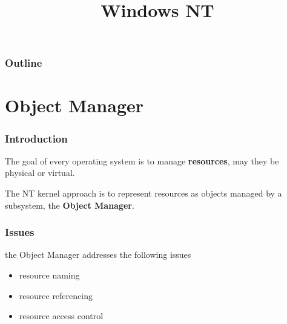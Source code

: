 %
%
%
%
%
%

%
%

%
%

\def\path{../..}

%
%



%
%

\title{Windows NT}

%
%



%
%

\begin{frame}
  \titlepage
\end{frame}

%
%

\begin{frame}
  \frametitle{Outline}

  \tableofcontents
\end{frame}

%
%

\section{Object Manager}


\begin{frame}
  \frametitle{Introduction}

 The goal of every operating system is to manage \textbf{resources}, may
 they be physical or virtual.

  \-

 The NT kernel approach is to represent resources as objects managed by a
 subsystem, the \textbf{Object Manager}.

\end{frame}


\begin{frame}
  \frametitle{Issues}

  the Object Manager addresses the following issues

  \begin{itemize}
    \item
      resource naming
    \item
      resource referencing
    \item
      resource access control
 \end{itemize}
\end{frame}

